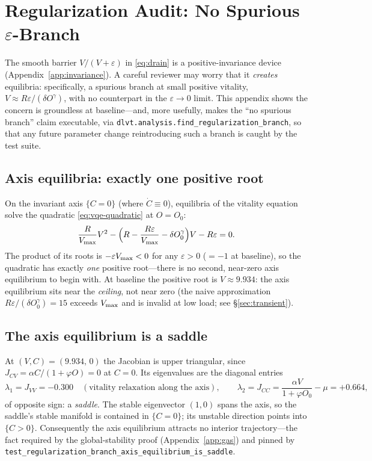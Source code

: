 \section{Regularization Audit: No Spurious $\varepsilon$-Branch}
\label{app:regularization}

The smooth barrier $V/(V+\varepsilon)$ in \eqref{eq:drain} is a
positive-invariance device (Appendix~\ref{app:invariance}). A careful
reviewer may worry that it \emph{creates} equilibria: specifically, a
spurious branch at small positive vitality,
$V\approx R\varepsilon/(\delta O^{\gamma})$, with no counterpart in the
$\varepsilon\to0$ limit. This appendix shows the concern is groundless at
baseline---and, more usefully, makes the ``no spurious branch'' claim
executable, via \texttt{dlvt.analysis.find\_regularization\_branch}, so
that any future parameter change reintroducing such a branch is caught by
the test suite.

\subsection{Axis equilibria: exactly one positive root}

On the invariant axis $\{C=0\}$ (where $\dot C\equiv0$), equilibria of the
vitality equation solve the quadratic \eqref{eq:vqe-quadratic} at $O=O_0$:
\[
\frac{R}{V_{\max}}V^{2}
-\Bigl(R-\frac{R\varepsilon}{V_{\max}}-\delta O_0^{\gamma}\Bigr)V
-R\varepsilon=0 .
\]
The product of its roots is $-\varepsilon V_{\max}<0$ for any $\varepsilon>0$
($=-1$ at baseline), so the quadratic has exactly \emph{one} positive
root---there is no second, near-zero axis equilibrium to begin with. At
baseline the positive root is $V\approx9.934$: the axis equilibrium sits
near the \emph{ceiling}, not near zero (the naive approximation
$R\varepsilon/(\delta O_0^{\gamma})=15$ exceeds $V_{\max}$ and is invalid at
low load; see \S\ref{sec:transient}).

\subsection{The axis equilibrium is a saddle}

At $(V,C)=(9.934,\,0)$ the Jacobian is upper triangular, since
$J_{CV}=\alpha C/(1+\varphi O)=0$ at $C=0$. Its eigenvalues are the
diagonal entries
\[
\lambda_1=J_{VV}=-0.300
\quad(\text{vitality relaxation along the axis}),\qquad
\lambda_2=J_{CC}=\frac{\alpha V}{1+\varphi O_0}-\mu=+0.664 ,
\]
of opposite sign: a \emph{saddle}. The stable eigenvector $(1,0)$ spans the
axis, so the saddle's stable manifold is contained in $\{C=0\}$; its
unstable direction points into $\{C>0\}$. Consequently the axis equilibrium
attracts no interior trajectory---the fact required by the
global-stability proof (Appendix~\ref{app:gas}) and pinned by
\texttt{test\_regularization\_branch\_axis\_equilibrium\_is\_saddle}.

